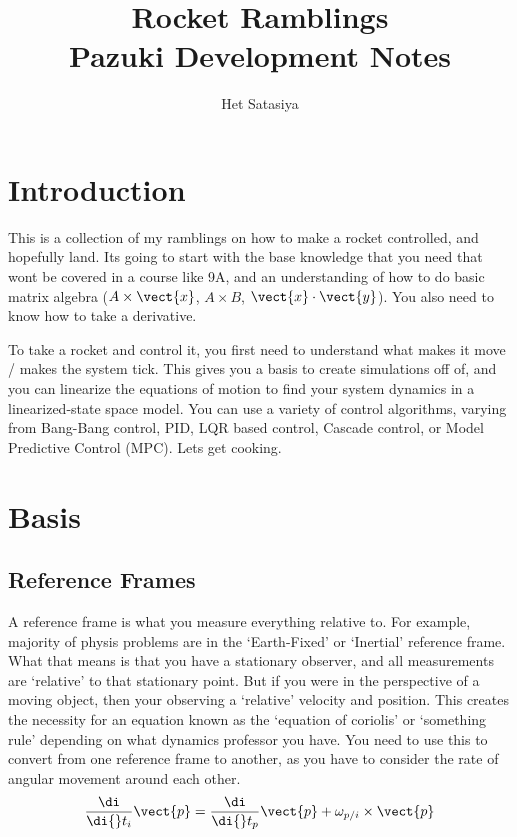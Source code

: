 \documentclass{article}
\title{%
Rocket Ramblings \\
\large Pazuki Development Notes}
\author{Het Satasiya}
\newcommand{\diff}[1]{\frac{\di}{\di{}t_{#1}}}
\begin{document}
\maketitle

\pagebreak

\section{Introduction}
This is a collection of my ramblings on how to make a rocket controlled, and hopefully land. Its going to start with the base knowledge that you need that wont be covered in a course like 9A, and an understanding of how to do basic matrix algebra ($A \times \vect{x}$, $A \times B$, $\vect{x} \cdot \vect{y}$). You also need to know how to take a derivative.

To take a rocket and control it, you first need to understand what makes it move / makes the system tick. This gives you a basis to create simulations off of, and you can linearize the equations of motion to find your system dynamics in a linearized{-}state space model. You can use a variety of control algorithms, varying from Bang{-}Bang control, PID, LQR based control, Cascade control, or Model Predictive Control (MPC). Lets get cooking.

\section{Basis}

\subsection{Reference Frames}
A reference frame is what you measure everything relative to. For example, majority of physis problems are in the `Earth-Fixed' or `Inertial' reference frame. What that means is that you have a stationary observer, and all measurements are `relative' to that stationary point. But if you were in the perspective of a moving object, then your observing a `relative' velocity and position. This creates the necessity for an equation known as the `equation of coriolis' or `something rule' depending on what dynamics professor you have. You need to use this to convert from one reference frame to another, as you have to consider the rate of angular movement around each other.  
\begin{equation} \label{eq:1}
    \diff{i} \vect{p} =  \diff{p}\vect{p} + \omega_{p/i} \times \vect{p}
\end{equation}
\end{document}

